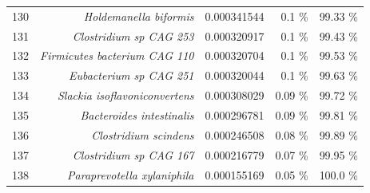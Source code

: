 \documentclass{article}
\begin{document}
\begin{table}
\begin{tabular}{|r|r|r|r|r|}
      130 & \textit{Holdemanella biformis} & 0.000341544 & 0.1 \% & 99.33 \% \\
      131 & \textit{Clostridium sp CAG 253} & 0.000320917 & 0.1 \% & 99.43 \% \\
      132 & \textit{Firmicutes bacterium CAG 110} & 0.000320704 & 0.1 \% & 99.53 \% \\
      133 & \textit{Eubacterium sp CAG 251} & 0.000320044 & 0.1 \% & 99.63 \% \\
      134 & \textit{Slackia isoflavoniconvertens} & 0.000308029 & 0.09 \% & 99.72 \% \\
      135 & \textit{Bacteroides intestinalis} & 0.000296781 & 0.09 \% & 99.81 \% \\
      136 & \textit{Clostridium scindens} & 0.000246508 & 0.08 \% & 99.89 \% \\
      137 & \textit{Clostridium sp CAG 167} & 0.000216779 & 0.07 \% & 99.95 \% \\
      138 & \textit{Paraprevotella xylaniphila} & 0.000155169 & 0.05 \% & 100.0 \% \\\hline\hline
    \end{tabular}
  \end{table}
\end{document}
